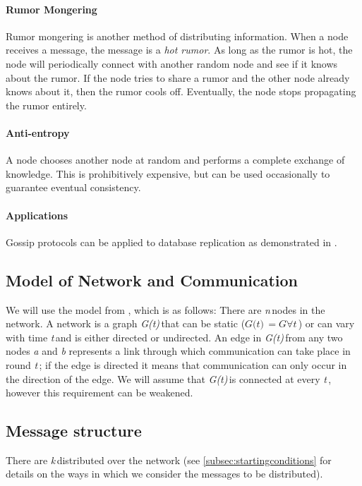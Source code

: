 \documentclass{article} %
\def\numNodes{\textit{n}\,}
\def\graph{\textit{G(t)}\,}
\def\graphtime{\textit{t}\,}
\def\numMessages{\textit{k}\,}
\begin{document}
\paragraph{Rumor Mongering}
Rumor mongering is another method of distributing information. When a node receives a message, the message is a \textit{hot rumor}. As long as the rumor is hot, the node will periodically connect with another random node and see if it knows about the rumor. If the node tries to share a rumor and the other node already knows about it, then the rumor cools off. Eventually, the node stops propagating the rumor entirely. 

\paragraph{Anti-entropy}
A node chooses another node at random and performs a complete exchange of knowledge. This is prohibitively expensive, but can be used occasionally to guarantee eventual consistency.

\paragraph{Applications}
Gossip protocols can be applied to database replication as demonstrated in \cite{demers1987epidemic}. 

\subsection{Model of Network and Communication}
We will use the model from \cite{haeupler2011analyzing}, which is as follows: There are \numNodes nodes in the network. A network is a graph \graph that can be static ($\graph = G  \forall \graphtime$) or can vary with time \graphtime and is either directed or undirected. An edge in \graph from any two nodes \textit{a} and \textit{b} represents a link through which communication can take place in round \graphtime; if the edge is directed it means that communication can only occur in the direction of the edge. We will assume that \graph is connected at every \graphtime, however this requirement can be weakened. 

\subsection{Message structure}
There are \numMessages distributed over the network (see \ref{subsec:startingconditions} for details on the ways in which we consider the messages to be distributed). 
\end{document}
